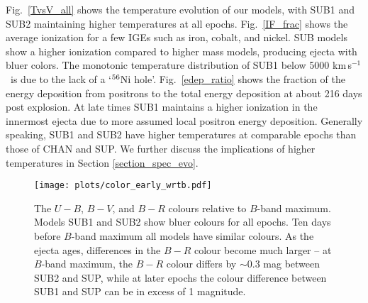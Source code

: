 \documentclass[useAMS,usenatbib,useasmath]{mnras}
\newcommand{\kms}{\hbox{km$\,$s$^{-1}$}}
\newcommand{\elem}[2][default]{$^{#1}{\rm #2}$}
\def\fig{Fig.}
\begin{document}
\fig~\ref{TvsV_all} shows the temperature evolution of our models, with SUB1 and SUB2 maintaining higher temperatures at all epochs. \fig~\ref{IF_frac} shows the average ionization for a few IGEs such as iron, cobalt, and nickel. SUB models show a higher ionization compared to higher mass models, producing ejecta with bluer colors. The monotonic temperature distribution of SUB1 below 5000 \kms\ is due to the lack of a `\elem[56]{Ni} hole'. \fig~\ref{edep_ratio} shows the fraction of the energy deposition from positrons to the total energy deposition at about 216 days post explosion. At late times SUB1 maintains a higher ionization in the innermost ejecta due to more assumed local positron energy deposition. Generally speaking, SUB1 and SUB2 have higher temperatures at comparable epochs than those of CHAN and SUP. We further discuss the implications of higher temperatures in Section \ref{section_spec_evo}.

\begin{figure*} 
\texttt{[image: plots/color\_early\_wrtb.pdf]}
\caption{The $U-B$, $B-V$, and $B-R$ colours relative to $B$-band maximum. Models SUB1 and SUB2 show bluer colours for all epochs. Ten days before $B$-band maximum all models have similar colours. As the ejecta ages, differences in the $B-R$ colour become much larger -- at $B$-band maximum, the $B-R$ colour differs by  $\sim$0.3 mag between SUB2 and SUP, while at later epochs the colour difference between SUB1 and SUP can be in excess of 1 magnitude.}
\label{LCcolor}
\end{figure*}
\end{document}
